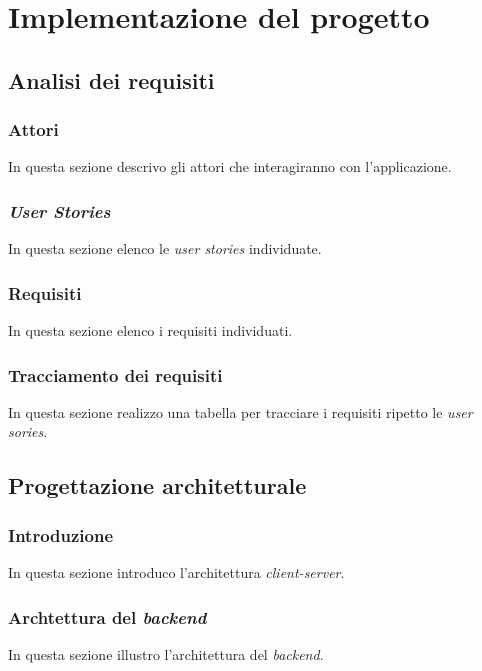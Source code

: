 
\chapter{Implementazione del progetto}
\label{cap:implementazione}
\section{Analisi dei requisiti}

\subsection{Attori}
In questa sezione descrivo gli attori che interagiranno con l'applicazione.

\subsection{\emph{User Stories}}
In questa sezione elenco le \emph{user stories} individuate.

\subsection{Requisiti}
In questa sezione elenco i requisiti individuati.

\subsection{Tracciamento dei requisiti}
In questa sezione realizzo una tabella per tracciare i requisiti ripetto le \emph{user sories}.

\section{Progettazione architetturale}

\subsection{Introduzione}
In questa sezione introduco l'architettura \emph{client-server}.

\subsection{Archtettura del \emph{backend}}
In questa sezione illustro l'architettura del \emph{backend}.

